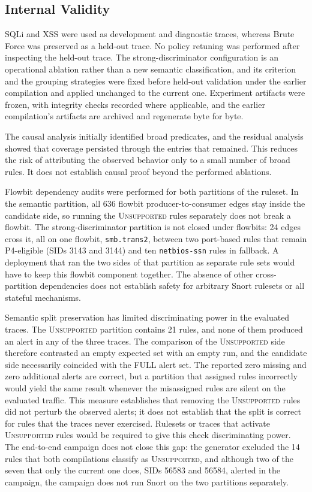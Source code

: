 \documentclass{article}
\begin{document}
\subsection{Internal Validity}
SQLi and XSS were used as development and diagnostic traces, whereas Brute
Force was preserved as a held-out trace. No policy retuning was performed
after inspecting the held-out trace. The strong-discriminator configuration
is an operational ablation rather than a new semantic classification, and
its criterion and the grouping strategies were fixed before held-out
validation under the earlier compilation and applied unchanged to the
current one. Experiment artifacts were frozen, with integrity checks
recorded where applicable, and the earlier compilation's artifacts are
archived and regenerate byte for byte.

The causal analysis initially identified broad predicates, and the residual
analysis showed that coverage persisted through the entries that remained.
This reduces the risk of attributing the observed behavior only to a small
number of broad rules. It does not establish causal proof beyond the
performed ablations.

Flowbit dependency audits were performed for both partitions of the
ruleset. In the semantic partition, all 636 flowbit producer-to-consumer
edges stay inside the candidate side, so running the \textsc{Unsupported}
rules separately does not break a flowbit. The strong-discriminator
partition is not closed under flowbits: 24 edges cross it, all on one
flowbit, \texttt{smb.trans2}, between two port-based rules that remain
P4-eligible (SIDs 3143 and 3144) and ten \texttt{netbios-ssn} rules in
fallback. A deployment that ran the two sides of that partition as separate
rule sets would have to keep this flowbit component together. The absence of
other cross-partition dependencies does not establish safety for arbitrary
Snort rulesets or all stateful mechanisms.

Semantic split preservation has limited discriminating power in the evaluated
traces. The \textsc{Unsupported} partition contains 21 rules, and none of them
produced an alert in any of the three traces. The comparison of the
\textsc{Unsupported} side therefore contrasted an empty expected set with an
empty run, and the candidate side necessarily coincided with the FULL alert
set. The reported zero missing and zero additional alerts are correct, but a
partition that assigned rules incorrectly would yield the same result whenever
the misassigned rules are silent on the evaluated traffic. This measure
establishes that removing the \textsc{Unsupported} rules did not perturb the
observed alerts; it does not establish that the split is correct for rules
that the traces never exercised. Rulesets or traces that activate
\textsc{Unsupported} rules would be required to give this check
discriminating power. The end-to-end campaign does not close this gap: the
generator excluded the 14 rules that both compilations classify as
\textsc{Unsupported}, and although two of the seven that only the current
one does, SIDs 56583 and 56584, alerted in the campaign, the campaign does
not run Snort on the two partitions separately.
\end{document}
